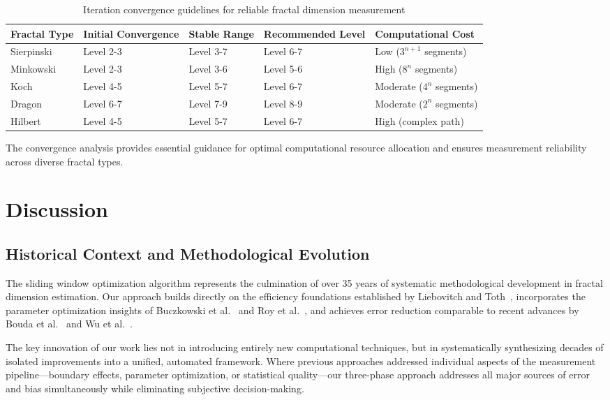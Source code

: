 \documentclass[preprint,12pt]{elsarticle}
\def\textbf#1{#1}%
\begin{document}
\begin{table}[H]
\centering
\small
\begin{tabularx}{\textwidth}{@{}lXXXX@{}}
\toprule
\textbf{Fractal Type} & \textbf{Initial Convergence} & \textbf{Stable Range} & \textbf{Recommended Level} & \textbf{Computational Cost} \\
\midrule
Sierpinski & Level 2-3 & Level 3-7 & Level 6-7 & Low ($3^{n+1}$ segments) \\
Minkowski & Level 2-3 & Level 3-6 & Level 5-6 & High ($8^n$ segments) \\
Koch & Level 4-5 & Level 5-7 & Level 6-7 & Moderate ($4^n$ segments) \\
Dragon & Level 6-7 & Level 7-9 & Level 8-9 & Moderate ($2^n$ segments) \\
Hilbert & Level 4-5 & Level 5-7 & Level 6-7 & High (complex path) \\
\bottomrule
\end{tabularx}
\caption{Iteration convergence guidelines for reliable fractal dimension measurement}
\label{tab:convergence_guidelines}
\end{table}

The convergence analysis provides essential guidance for optimal computational resource allocation and ensures measurement reliability across diverse fractal types.

\section{Discussion}
\label{sec:discussion}

\subsection{Historical Context and Methodological Evolution}

The sliding window optimization algorithm represents the culmination of over 35 years of systematic methodological development in fractal dimension estimation. Our approach builds directly on the efficiency foundations established by Liebovitch and Toth~\cite{liebovitch1989}, incorporates the parameter optimization insights of Buczkowski et al.~\cite{buczkowski1998} and Roy et al.~\cite{roy2007}, and achieves error reduction comparable to recent advances by Bouda et al.~\cite{bouda2016} and Wu et al.~\cite{wu2020}.

The key innovation of our work lies not in introducing entirely new computational techniques, but in systematically synthesizing decades of isolated improvements into a unified, automated framework. Where previous approaches addressed individual aspects of the measurement pipeline—boundary effects, parameter optimization, or statistical quality—our three-phase approach addresses all major sources of error and bias simultaneously while eliminating subjective decision-making.
\end{document}
